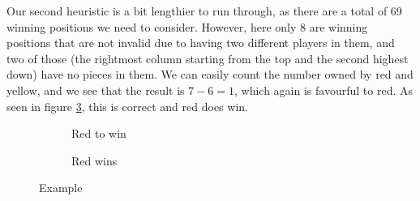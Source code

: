 \documentclass{article}
\newcommand{\rd}{\node [player, fill=red]{};}
\newcommand{\yw}{\node [player, fill=yellow] {};}
\newcommand{\gy}{\node [player, fill=white] {};}
\newcommand{\rt}{\node [threat, fill=red!50] {};}
\newcommand{\yt}{\node [threat, fill=yellow!50] {};}
\begin{document}
Our second heuristic is a bit lengthier to run through, as there are a total of 69 winning positions we need to consider. However, here only 8 are winning positions that are not invalid due to having two different players in them, and two of those (the rightmost column starting from the top and the second highest down) have no pieces in them. We can easily count the number owned by red and yellow, and we see that the result is $7-6 = 1$, which again is favourful to red. As seen in figure \ref{fig:win}, this is correct and red does win.
\begin{figure}[t]
	\centering
	\begin{subfigure}[b]{0.4\textwidth}
		\centering
		\caption{Red to win}
		\label{fig:example}
	\end{subfigure}
	\begin{subfigure}[b]{0.4\textwidth}
		\centering
		\caption{Red wins}
		\label{fig:win}
	\end{subfigure}
	\caption{Example}
\end{figure}
\newpage
\end{document}
